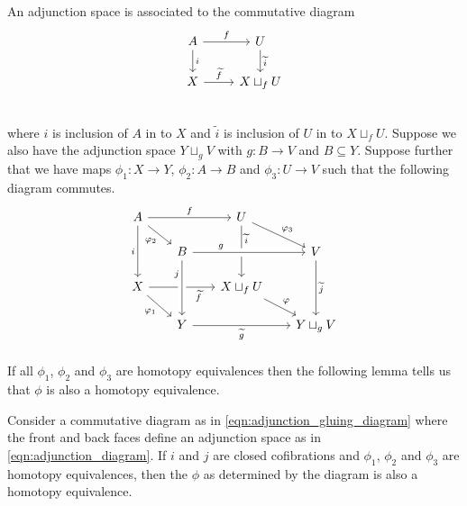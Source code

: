\documentclass[class=article, crop=false]{standalone}
\begin{document}
An adjunction space is associated to the commutative diagram
\begin{equation}
    \begin{tikzcd}
            A \ar[r, "f" ] \ar[d, "i"]  &   U  \ar[d, "\widetilde{i}"]    \\
            X \ar[r, "\widetilde{f}"]         &   X \sqcup_f U            \\
    \end{tikzcd}
\label{eqn:adjunction_diagram}
\end{equation}
where $i$ is inclusion of $A$ in to $X$ and $\widetilde{i}$ is inclusion of $U$ in to $X \sqcup_f U $. Suppose we also have the adjunction space $Y \sqcup_g V$ with $g \colon B \to V$ and $B\subseteq Y$. Suppose further that we have maps $ \phi_1 \colon X \to Y$, $\phi_2 \colon A \to B$ and $\phi_3 \colon U \to V$ such that the following diagram commutes.
\begin{equation}
    \begin{tikzcd}[row sep=scriptsize, column sep=scriptsize]
A \ar[dr, "\phi_2"'] \ar[rr, "f"] \ar[dd, "i"']     &                                                                           &   U \ar[dr, "\phi_3"] \ar[dd, "\widetilde{i}", near start]  &                         \\
                                                &   B \ar[rr, crossing over, "g" near start]                                &                                                       &   V \ar[dd, "\widetilde{j}"]  \\
X \ar[dr, "\phi_1"'] \ar[rr, "\widetilde{f}"', near end]  &                                                                           &   X \sqcup_f U \ar[dr, "\phi"]                        &                         \\
                                                &   Y \ar[rr, "\widetilde{g}"']  \ar[from=uu, crossing over, "j"', near start]    &                                                       &   Y\sqcup_gV            \\
    \end{tikzcd}
\label{eqn:adjunction_gluing_diagram}
\end{equation}
If all $\phi_1$, $\phi_2$ and $\phi_3$ are homotopy equivalences then the following lemma tells us that $\phi$ is also a homotopy equivalence.


\begin{lemma}
    Consider a commutative diagram as in \eqref{eqn:adjunction_gluing_diagram} where the front and back faces define an adjunction space as in \eqref{eqn:adjunction_diagram}. If $i$ and $j$ are closed cofibrations and $\phi_1$, $\phi_2$ and $\phi_3$ are homotopy equivalences, then the $\phi$ as determined by the diagram is also a homotopy equivalence.
    \label{lem:adjunction_gluing}
\end{lemma}
\end{document}
